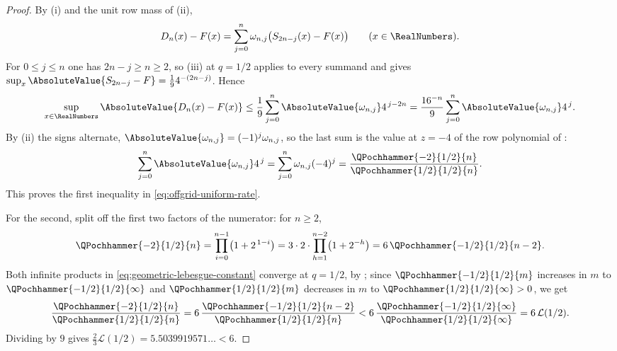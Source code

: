 \documentclass[11pt,a4paper,oneside,openany]{book}
\theoremstyle{definition}
\theoremstyle{remark}
\begin{document}
\begin{proof}
By (i) and the unit row mass of
(ii),
\[
 D_n(x)-F(x)=\sum_{j=0}^{n}\omega_{n,j}\bigl(S_{2n-j}(x)-F(x)\bigr)
 \qquad(x\in\RealNumbers).
\]
For $0\le j\le n$ one has $2n-j\ge n\ge2$, so
(iii) at $q=1/2$ applies to every summand and
gives $\sup_x\AbsoluteValue{S_{2n-j}-F}=\tfrac194^{-(2n-j)}$.  Hence
\[
 \sup_{x\in\RealNumbers}\AbsoluteValue{D_n(x)-F(x)}
 \le\frac19\sum_{j=0}^{n}\AbsoluteValue{\omega_{n,j}}4^{\,j-2n}
 =\frac{16^{-n}}9\sum_{j=0}^{n}\AbsoluteValue{\omega_{n,j}}4^{\,j}.
\]
By (ii) the signs alternate,
$\AbsoluteValue{\omega_{n,j}}=(-1)^j\omega_{n,j}$, so the last sum is the value at $z=-4$
of the row polynomial of :
\begin{equation}\label{eq:offgrid-weighted-row-norm}
 \sum_{j=0}^{n}\AbsoluteValue{\omega_{n,j}}4^{\,j}
 =\sum_{j=0}^{n}\omega_{n,j}(-4)^j
 =\frac{\QPochhammer{-2}{1/2}{n}}{\QPochhammer{1/2}{1/2}{n}} .
\end{equation}
This proves the first inequality in \eqref{eq:offgrid-uniform-rate}.

For the second, split off the first two factors of the numerator: for $n\ge2$,
\[
 \QPochhammer{-2}{1/2}{n}=\prod_{i=0}^{n-1}\bigl(1+2^{\,1-i}\bigr)
 =3\cdot2\cdot\prod_{h=1}^{n-2}\bigl(1+2^{-h}\bigr)
 =6\,\QPochhammer{-1/2}{1/2}{n-2}.
\]
Both infinite products in \eqref{eq:geometric-lebesgue-constant} converge at
$q=1/2$, by ; since $\QPochhammer{-1/2}{1/2}{m}$
increases in $m$ to $\QPochhammer{-1/2}{1/2}{\infty}$ and $\QPochhammer{1/2}{1/2}{m}$ decreases
in $m$ to $\QPochhammer{1/2}{1/2}{\infty}>0$, we get
\[
 \frac{\QPochhammer{-2}{1/2}{n}}{\QPochhammer{1/2}{1/2}{n}}
 =6\,\frac{\QPochhammer{-1/2}{1/2}{n-2}}{\QPochhammer{1/2}{1/2}{n}}
 <6\,\frac{\QPochhammer{-1/2}{1/2}{\infty}}{\QPochhammer{1/2}{1/2}{\infty}}
 =6\,\mathcal L(1/2).
\]
Dividing by $9$ gives $\tfrac23\mathcal L(1/2)=5.5039919571\ldots<6$.
\end{proof}
\end{document}
